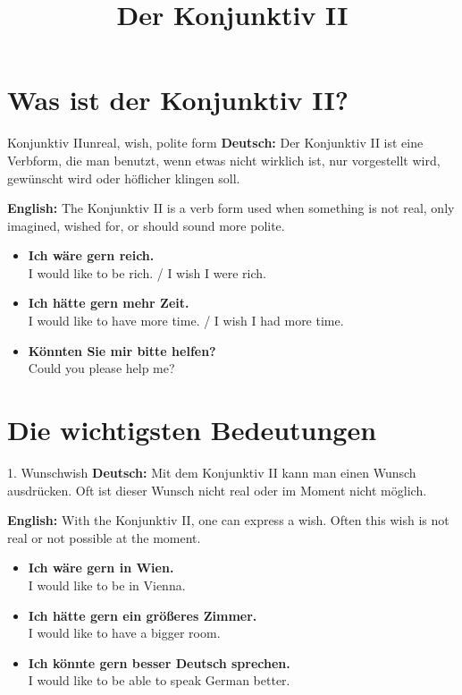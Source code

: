 \documentclass[a4paper,11pt]{article}
\title{Der Konjunktiv II}
\date{}
\newcommand{\GermanText}[1]{\textbf{Deutsch: }#1\par}
\newcommand{\EnglishText}[1]{{\small\color{SoftGray}\textbf{English: }#1\par}}
\newcommand{\ExampleItem}[2]{\item \textbf{#1}\\{\small\color{SoftGray}#2}}
\begin{document}
    \maketitle
    \tableofcontents
    \newpage
    
    \section{Was ist der Konjunktiv II?}
    
    \begin{grammarentry}{Konjunktiv II}{unreal, wish, polite form}
        \GermanText{Der Konjunktiv II ist eine Verbform, die man benutzt, wenn etwas nicht wirklich ist, nur vorgestellt wird, gewünscht wird oder höflicher klingen soll.}
        \EnglishText{The Konjunktiv II is a verb form used when something is not real, only imagined, wished for, or should sound more polite.}
        
        \begin{exbox}
            \begin{itemize}
                \ExampleItem{Ich wäre gern reich.}{I would like to be rich. / I wish I were rich.}
                \ExampleItem{Ich hätte gern mehr Zeit.}{I would like to have more time. / I wish I had more time.}
                \ExampleItem{Könnten Sie mir bitte helfen?}{Could you please help me?}
            \end{itemize}
        \end{exbox}
    \end{grammarentry}
    
    \section{Die wichtigsten Bedeutungen}
    
    \begin{grammarentry}{1. Wunsch}{wish}
        \GermanText{Mit dem Konjunktiv II kann man einen Wunsch ausdrücken. Oft ist dieser Wunsch nicht real oder im Moment nicht möglich.}
        \EnglishText{With the Konjunktiv II, one can express a wish. Often this wish is not real or not possible at the moment.}
        
        \begin{exbox}
            \begin{itemize}
                \ExampleItem{Ich wäre gern in Wien.}{I would like to be in Vienna.}
                \ExampleItem{Ich hätte gern ein größeres Zimmer.}{I would like to have a bigger room.}
                \ExampleItem{Ich könnte gern besser Deutsch sprechen.}{I would like to be able to speak German better.}
            \end{itemize}
        \end{exbox}
    \end{grammarentry}
    
\end{document}
